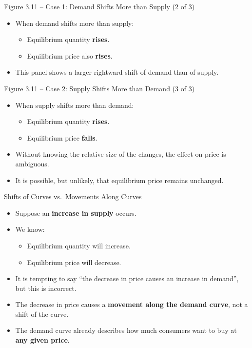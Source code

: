 \documentclass[aspectratio=169]{beamer}
\begin{document}
\begin{frame}{Figure 3.11 -- Case 1: Demand Shifts More than Supply (2 of 3)}
\transfade
\begin{itemize}[<+->]
  \item When demand shifts more than supply:
  \begin{itemize}[<+->]
    \item Equilibrium quantity \textbf{rises}.
    \item Equilibrium price also \textbf{rises}.
  \end{itemize}
  \item This panel shows a larger rightward shift of demand than of supply.
\end{itemize}
\end{frame}

\begin{frame}{Figure 3.11 -- Case 2: Supply Shifts More than Demand (3 of 3)}
\transfade
\begin{itemize}[<+->]
  \item When supply shifts more than demand:
  \begin{itemize}[<+->]
    \item Equilibrium quantity \textbf{rises}.
    \item Equilibrium price \textbf{falls}.
  \end{itemize}
  \item Without knowing the relative size of the changes, the effect on price is ambiguous.
  \item It is possible, but unlikely, that equilibrium price remains unchanged.
\end{itemize}
\end{frame}

\begin{frame}{Shifts of Curves vs.\ Movements Along Curves}
\transfade
\begin{itemize}[<+->]
  \item Suppose an \textbf{increase in supply} occurs.
  \item We know:
  \begin{itemize}[<+->]
    \item Equilibrium quantity will increase.
    \item Equilibrium price will decrease.
  \end{itemize}
  \item It is tempting to say ``the decrease in price causes an increase in demand'', but this is incorrect.
  \item The decrease in price causes a \textbf{movement along the demand curve}, not a shift of the curve.
  \item The demand curve already describes how much consumers want to buy at \textbf{any given price}.
\end{itemize}
\end{frame}
\end{document}
